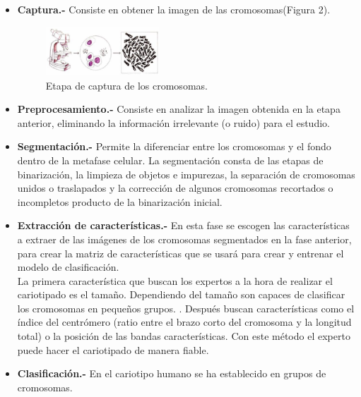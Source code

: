 \documentclass[12pt,letterpaper,titlepage]{article}
\begin{document}
\begin{itemize}\itemsep=0pt
\item  \textbf{Captura.-} Consiste en obtener la imagen de las cromosomas(Figura 2).
\begin{figure}
  \centering
    \includegraphics[width=0.4\textwidth]{1_Captura}
  \caption{Etapa de captura de los cromosomas.}
  \label{fig2:EBRP}
\end{figure}

\item  \textbf{Preprocesamiento.-} Consiste en analizar la imagen obtenida en la etapa anterior, eliminando la información irrelevante (o ruido) para el estudio.
\item  \textbf{Segmentación.-} Permite la diferenciar entre los cromosomas y el fondo dentro de la metafase celular. La segmentación consta de las etapas de binarización, la limpieza de objetos e impurezas, la separación de cromosomas unidos o traslapados y la corrección de algunos cromosomas recortados o incompletos producto de la binarización inicial.
\item  \textbf{Extracción de características.-} En esta fase se escogen las características a extraer de las imágenes de los cromosomas segmentados en la fase anterior, para crear la matriz de características que se usará para crear y entrenar el modelo de clasificación.\\
La primera característica que buscan los expertos a la hora de realizar el cariotipado es el tamaño. Dependiendo del tamaño son capaces de clasificar los cromosomas en pequeños grupos. \cite{131}. Después buscan características como el índice del centrómero (ratio entre el brazo corto del cromosoma y la longitud total) o la posición de las bandas características. Con este método el experto puede hacer el cariotipado de manera fiable.
\item  \textbf{Clasificación.-} En el cariotipo humano se ha establecido en grupos de cromosomas.\\




\end{itemize}
\end{document}
